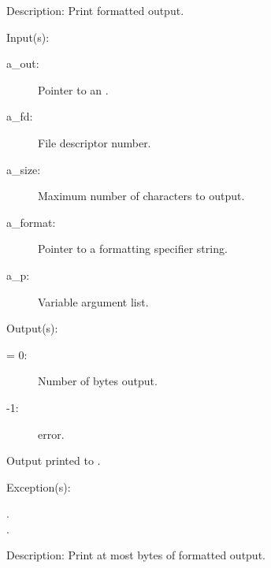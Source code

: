 \begin{capi}
\begin{capilist}
\begin{description}
		\end{description}
	\item[Description: ]
		Print formatted output.
	\end{capilist}
\label{out_put_fvn}
	\begin{capilist}
	\item[Input(s): ]
		\begin{description}\item[]
		\item[a\_out: ]
			Pointer to an .
		\item[a\_fd: ]
			File descriptor number.
		\item[a\_size: ]
			Maximum number of characters to output.
		\item[a\_format: ]
			Pointer to a formatting specifier string.
		\item[a\_p: ]
			Variable argument list.
		\end{description}
	\item[Output(s): ]
		\begin{description}\item[]
		\item[retval: ]
			\begin{description}\item[]
			\item[{\gt}= 0: ]
				Number of bytes output.
			\item[-1: ]
				 error.
			\end{description}
		\item{Output printed to .}
		\end{description}
	\item[Exception(s): ]
		\begin{description}\item[]
		\item[.]
		\item[.]
		\end{description}
	\item[Description: ]
		Print at most  bytes of formatted output.
	\end{capilist}
\label{out_put_s}
\end{capi}
